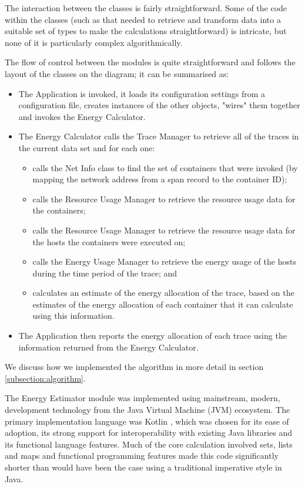 The interaction between the classes is fairly straightforward.  Some of the code within the classes (such as that needed to retrieve and transform data into a suitable set of types to make the calculations straightforward) is intricate, but none of it is particularly complex algorithmically.

The flow of control between the modules is quite straightforward and follows the layout of the classes on the diagram; it can be summarised as:

\begin{itemize}
	\item The Application is invoked, it loads its configuration settings from a configuration file, creates instances of the other objects, "wires" them together and invokes the Energy Calculator.
	\item The Energy Calculator calls the Trace Manager to retrieve all of the traces in the current data set and for each one:
	\begin{itemize}
		\item calls the Net Info class to find the set of containers that were invoked (by mapping the network address from a span record to the container ID);
		\item calls the Resource Usage Manager to retrieve the resource usage data for the containers;
		\item calls the Resource Usage Manager to retrieve the resource usage data for the hosts the containers were executed on;
		\item calls the Energy Usage Manager to retrieve the energy usage of the hosts during the time period of the trace; and
		\item calculates an estimate of the energy allocation of the trace, based on the estimates of the energy allocation of each container that it can calculate using this information.
	\end{itemize}
	\item The Application then reports the energy allocation of each trace using the information returned from the Energy Calculator. 
\end{itemize}

We discuss how we implemented the algorithm in more detail in section \ref{subsection:algorithm}.

The Energy Estimator module was implemented using mainstream, modern, development technology from the Java Virtual Machine (JVM) ecosystem.  The primary implementation language was Kotlin \cite{jemerov2017-kotlin}, which was chosen for its ease of adoption, its strong support for interoperability with existing Java libraries and its functional language features.  Much of the core calculation involved sets, lists and maps and functional programming features made this code significantly shorter than would have been the case using a traditional imperative style in Java. 

